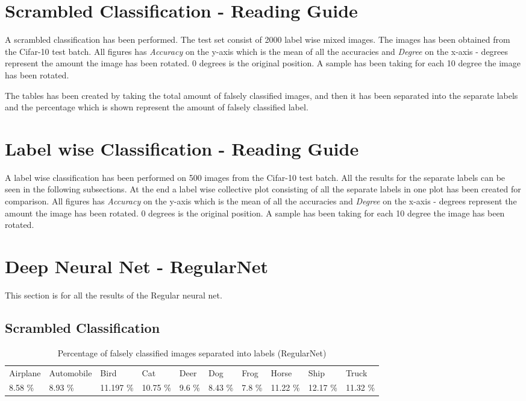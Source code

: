 \section{Scrambled Classification - Reading Guide}
A scrambled classification has been performed. The test set consist of 2000 label wise mixed images. The images has been obtained from the Cifar-10 test batch.
All figures has \emph{Accuracy} on the y-axis which is the mean of all the accuracies and \emph{Degree} on the x-axis - degrees represent the amount the image has been rotated. 0 degrees is the original position. A sample has been taking for each 10 degree the image has been rotated.

The tables has been created by taking the total amount of falsely classified images, and then it has been separated into the separate labels and the percentage which is shown represent the amount of falsely classified label.

\section{Label wise Classification - Reading Guide}
A label wise classification has been performed on 500 images from the Cifar-10 test batch. All the results for the separate labels can be seen in the following subsections. At the end a label wise collective plot consisting of all the separate labels in one plot has been created for comparison.
All figures has \emph{Accuracy} on the y-axis which is the mean of all the accuracies and \emph{Degree} on the x-axis - degrees represent the amount the image has been rotated. 0 degrees is the original position. A sample has been taking for each 10 degree the image has been rotated.

\section{Deep Neural Net - RegularNet}
This section is for all the results of the Regular neural net.
\subsection{Scrambled Classification}
\FloatBarrier

\begin{table}[]
	\centering
	\caption{Percentage of falsely classified images separated into labels (RegularNet)}
	\label{table:falseclasReg}
	\begin{tabular}{llllllllll}
		Airplane & Automobile & Bird     & Cat    & Deer     & Dog     & Frog   & Horse    & Ship         & Truck         \\
		8.58 \%  & 8.93 \%    & 11.197 \% & 10.75 \% & 9.6 \% & 8.43 \% & 7.8 \% & 11.22 \% & 12.17 \% & 11.32 \%
	\end{tabular}
\end{table}
\FloatBarrier
